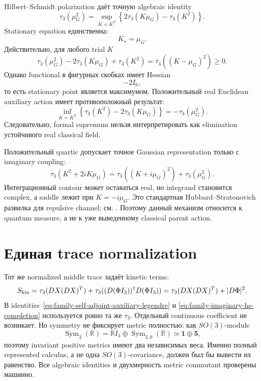 Hilbert--Schmidt polarization даёт точную algebraic identity
\begin{equation}
 \boxed{
 \tau_3(\mu_G^2)
 =\sup_{K=K^T}
 \left\{2\tau_3(K\mu_G)-\tau_3(K^2)\right\}.}
 \label{eq:family-self-adjoint-auxiliary-legendre}
\end{equation}
Stationary equation единственна:
\begin{equation}
 K_\star=\mu_G.
\end{equation}
Действительно, для любого trial \(K\)
\begin{equation}
 \tau_3(\mu_G^2)
 -2\tau_3(K\mu_G)+\tau_3(K^2)
 =\tau_3((K-\mu_G)^2)\ge0.
 \label{eq:family-auxiliary-legendre-gap}
\end{equation}
Однако functional в фигурных скобках имеет Hessian
\begin{equation}
 -2I_6,
\end{equation}
то есть stationary point является максимумом. Положительный real
Euclidean auxiliary action имеет противоположный результат:
\begin{equation}
 \inf_{K=K^T}
 \left\{\tau_3(K^2)-2\tau_3(K\mu_G)\right\}
 =-\tau_3(\mu_G^2).
 \label{eq:family-real-auxiliary-wrong-sign}
\end{equation}
Следовательно, formal supremum нельзя интерпретировать как elimination
устойчивого real classical field.

Положительный quartic допускает точное Gaussian representation только с
imaginary coupling:
\begin{equation}
 \tau_3(K^2+2iK\mu_G)
 =\tau_3((K+i\mu_G)^2)+\tau_3(\mu_G^2).
 \label{eq:family-imaginary-hs-completion}
\end{equation}
Интеграционный contour может оставаться real, но integrand становится
complex, а saddle лежит при \(K=-i\mu_G\). Это стандартная
Hubbard--Stratonovich развилка для repulsive channel; см.
. Поэтому данный механизм относится к quantum
measure, а не к уже выведенному classical parent action.

\section{Единая trace normalization}

Тот же normalized middle trace задаёт kinetic terms:
\begin{equation}
 S_{\rm kin}
 =\tau_3(DX(DX)^T)
 +\tau_3((D(\Phi I_3))^\dagger D(\Phi I_3))
 =\tau_3(DX(DX)^T)+|D\Phi|^2.
 \label{eq:family-common-kinetic-trace}
\end{equation}
В identities~\eqref{eq:family-self-adjoint-auxiliary-legendre} и
\eqref{eq:family-imaginary-hs-completion} используется ровно та же
\(\tau_3\). Отдельный continuous coefficient не возникает. Но symmetry не
фиксирует metric полностью: как \(SO(3)\)-module
\begin{equation}
 \operatorname{Sym}_3(\mathbb R)
 =\mathbb RI_3\oplus\operatorname{Sym}_{3,0}(\mathbb R)
 \simeq \mathbf1\oplus\mathbf5,
\end{equation}
поэтому invariant positive metrics имеют два независимых веса. Именно
полный represented calculus, а не одна \(SO(3)\)-covariance, должен был бы
вывести их равенство. Все algebraic identities и двухмерность metric
commutant проверены машинно.

